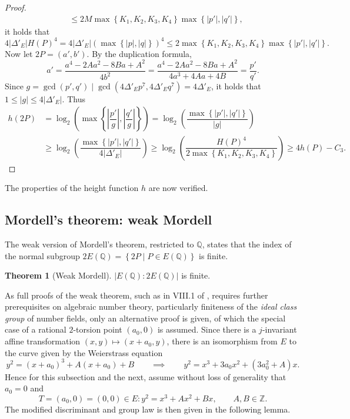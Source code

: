 \documentclass{article}
\newcommand{\Z}{\mathbb{Z}}
\newcommand{\Q}{\mathbb{Q}}
\newcommand{\rb}[1]{\left( #1 \right)}
\newcommand{\cb}[1]{\left\{ #1 \right\}}
\newcommand{\abs}[1]{\left\lvert #1 \right\rvert}
\theoremstyle{definition}\newtheorem*{definition}{Definition}
\theoremstyle{definition}\newtheorem*{example}{Example}
\theoremstyle{definition}\newtheorem*{remark}{Remark}
\newtheorem{theorem}[proposition]{Theorem}
\begin{document}
\begin{proof}
\begin{align*}
& \le 2M\max\cb{K_1, K_2, K_3, K_4}\max\cb{\abs{p'}, \abs{q'}},
\end{align*}
it holds that
$$ 4\abs{\Delta'_E}H\rb{P}^4 = 4\abs{\Delta'_E}\rb{\max\cb{\abs{p}, \abs{q}}}^4 \le 2\max\cb{K_1, K_2, K_3, K_4}\max\cb{\abs{p'}, \abs{q'}}. $$
Now let $ 2P = \rb{a', b'} $. By the duplication formula,
$$ a' = \dfrac{a^4 - 2Aa^2 - 8Ba + A^2}{4b^2} = \dfrac{a^4 - 2Aa^2 - 8Ba + A^2}{4a^3 + 4Aa + 4B} = \dfrac{p'}{q'}. $$
Since $ g = \gcd\rb{p', q'} \mid \gcd\rb{4\Delta'_E p^7, 4\Delta'_E q^7} = 4\Delta'_E $, it holds that $ 1 \le \abs{g} \le 4\abs{\Delta'_E} $. Thus
\begin{align*}
h\rb{2P}
& = \log_2\rb{\max\cb{\abs{\dfrac{p'}{g}}, \abs{\dfrac{q'}{g}}}}
= \log_2\rb{\dfrac{\max\cb{\abs{p'}, \abs{q'}}}{\abs{g}}} \\
& \ge \log_2\rb{\dfrac{\max\cb{\abs{p'}, \abs{q'}}}{4\abs{\Delta'_E}}}
\ge \log_2\rb{\dfrac{H\rb{P}^4}{2\max\cb{K_1, K_2, K_3, K_4}}}
\ge 4h\rb{P} - C_3.
\end{align*}
\end{proof}

The properties of the height function $ h $ are now verified.

\pagebreak

\subsection{Mordell's theorem: weak Mordell}

The weak version of Mordell's theorem, restricted to $ \Q $, states that the index of the normal subgroup $ 2E\rb{\Q} = \cb{2P \mid P \in E\rb{\Q}} $ is finite.

\begin{theorem}[Weak Mordell]
\label{thm:weakmordell}
$ \abs{E\rb{\Q} : 2E\rb{\Q}} $ is finite.
\end{theorem}

As full proofs of the weak theorem, such as in VIII.1 of \cite{gtm}, requires further prerequisites on algebraic number theory, particularly finiteness of the \emph{ideal class group} of number fields, only an alternative proof is given, of which the special case of a rational $ 2 $-torsion point $ \rb{a_0, 0} $ is assumed. Since there is a $ j $-invariant affine transformation $ \rb{x, y} \mapsto \rb{x + a_0, y} $, there is an isomorphism from $ E $ to the curve given by the Weierstrass equation
$$ y^2 = \rb{x + a_0}^3 + A\rb{x + a_0} + B \qquad \implies \qquad y^2 = x^3 + 3a_0x^2 + \rb{3a_0^2 + A}x. $$
Hence for this subsection and the next, assume without loss of generality that $ a_0 = 0 $ and
$$ T = \rb{a_0, 0} = \rb{0, 0} \in E : y^2 = x^3 + Ax^2 + Bx, \qquad A, B \in \Z. $$
The modified discriminant and group law is then given in the following lemma.
\end{document}
